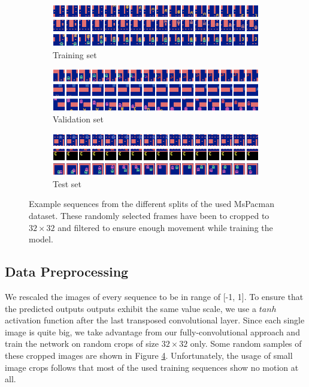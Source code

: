 \begin{figure}[htb]
\centering
\begin{subfigure}{1.0\textwidth}
  \centering
  \includegraphics[width=1.0\linewidth]{figures/ds/pac_train.png}
  \caption{Training set}
  \label{fig:pac_train}
  \vspace{.1cm}
\end{subfigure}
\begin{subfigure}{1.0\textwidth}
  \centering
  \includegraphics[width=1.0\linewidth]{figures/ds/pac_valid.png}
  \caption{Validation set}
  \label{fig:pac_valid}
  \vspace{.1cm}
\end{subfigure}
\begin{subfigure}{1.0\textwidth}
  \centering
  \includegraphics[width=1.0\linewidth]{figures/ds/pac_test.png}
  \caption{Test set}
  \label{fig:pac_test}
\end{subfigure}
\caption[MsPacman Crop Image Samples]{Example sequences from the different splits of the used MsPacman dataset. These randomly selected frames have been to cropped to $32 \times 32 $ and filtered to ensure enough movement while training the model.}
\label{fig:pacman}
\end{figure}


\subsection{Data Preprocessing} \label{sec:pacman_preprocessing}

We rescaled the images of every sequence to be in range of [-1, 1]. To ensure that the predicted outputs outputs exhibit the same value scale, we use a $tanh$ activation function after the last transposed convolutional layer. Since each single image is quite big, we take advantage from our fully-convolutional approach and train the network on random crops of size $ 32 \times 32 $ only. Some random samples of these cropped images are shown in Figure \ref{fig:pacman}. Unfortunately, the usage of small image crops follows that most of the used training sequences show no motion at all.

